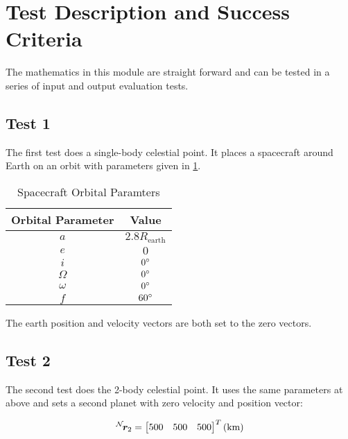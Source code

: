 

\section{Test Description and Success Criteria}
The mathematics in this module are straight forward and can be tested in a series of input and output evaluation tests.

\subsection{Test 1}
The first test does a single-body celestial point. It places a spacecraft around Earth on an orbit with parameters given in \ref{tab:orbitParams}. 
\begin{table}[htbp]
	\caption{Spacecraft Orbital Paramters}
	\label{tab:orbitParams}
	\centering \fontsize{10}{10}\selectfont
	\begin{tabular}{ c | c } %
		\hline\hline
		\textbf{Orbital Parameter}  & \textbf{Value}  \\ 
		\hline
		$a$    		        	     &  $2.8 R_{\text{earth}}	$   \\ 
		$e$           &  $0  $ \\ 
		$i$  & $0 ^{\circ} $\\ 
		$\Omega$  & $0^{\circ}  $\\ 
		$\omega$  & $0^{\circ}$\\ 
		$f$  & $60 ^{\circ} $\\ 
		\hline\hline
	\end{tabular}
\end{table}
The earth position and velocity vectors are both set to the zero vectors.

\subsection{Test 2}
The second test does the 2-body celestial point. It uses the same parameters at above and sets a second planet with zero velocity and position vector:

\begin{equation}
\leftexp{N}{\bm r_2} = \begin{bmatrix}500 & 500 &500 \end{bmatrix}^T (\text{km})
\end{equation}


